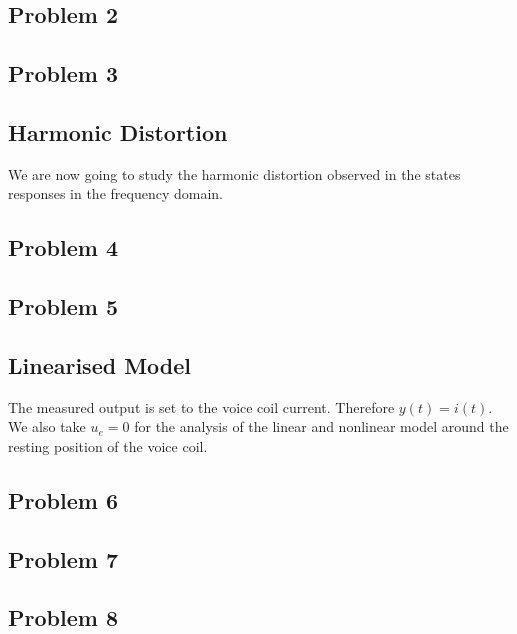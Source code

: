 \documentclass[11pt,a4paper,fleqn, onesside]{report}
\begin{document}
\subsection*{Problem 2}

\subsection*{Problem 3}


\subsection{Harmonic Distortion}
We are now going to study the harmonic distortion observed in the states responses in the frequency domain. 
\subsection*{Problem 4}

\subsection*{Problem 5}


\subsection{Linearised Model}
The measured output is set to the voice coil current. Therefore $y(t) = i(t)$.
We also take $u_{e} = 0$ for the analysis of the linear and nonlinear model around the resting position of the voice coil. 

\subsection*{Problem 6}


\subsection*{Problem 7}


\subsection*{Problem 8}

\end{document}
